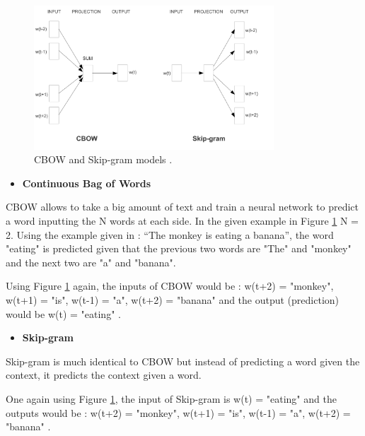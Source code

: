         \begin{figure}[H]
            \centering
            \captionsetup{justification=centering}
            \includegraphics[width=0.8\textwidth]{Sections/3StateOfTheArt/3_images/Cbow_Skip.png}
            \caption{CBOW and Skip-gram models \cite{Mikolov2013}.} 
            \label{fig:cbow_skip}
        \end{figure}



        \begin{itemize}
            \item \textbf{Continuous Bag of Words}
        \end{itemize}


       CBOW allows to take a big amount of text and train a neural network to predict a word inputting the N words at each side. In the given example in Figure \ref{fig:cbow_skip}  N = 2. Using the example given in \cite{Mordecki2017} : “The monkey is eating a banana”, the word "eating" is predicted given that the previous two words are "The" and "monkey" and the next two are "a" and "banana".

        Using Figure \ref{fig:cbow_skip} again, the inputs of CBOW would be : w(t+2) = "monkey", w(t+1) = "is", w(t-1) = "a", w(t+2) = "banana" and the output (prediction) would be w(t) = "eating" \cite{Mordecki2017}.
        
        
        \begin{itemize}
            \item \textbf{Skip-gram}
        \end{itemize}

        Skip-gram is much identical to CBOW but instead of predicting a word given the context, it predicts the context given a word. 

        One again using Figure \ref{fig:cbow_skip}, the input of Skip-gram is w(t) = "eating" and the outputs would be : w(t+2) = "monkey", w(t+1) = "is", w(t-1) = "a", w(t+2) = "banana" \cite{Mordecki2017}.


